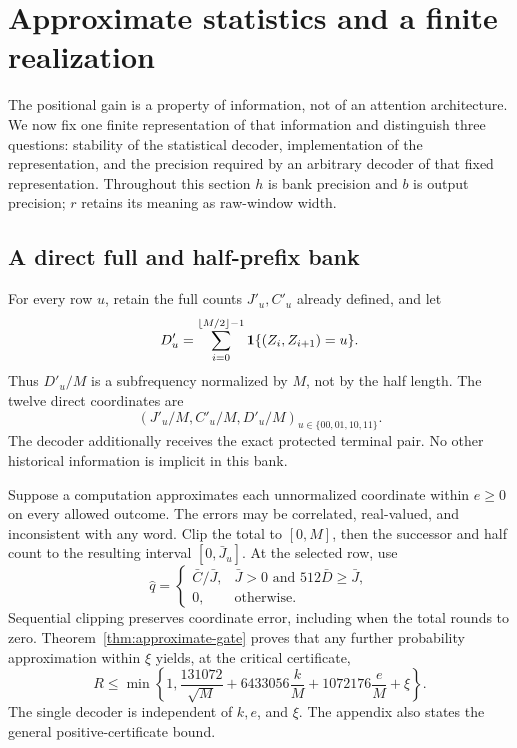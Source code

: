 \section{Approximate statistics and a finite realization}\label{sec:finite-implementation}
The positional gain is a property of information, not of an attention architecture. We now fix one finite representation of that information and distinguish three questions: stability of the statistical decoder, implementation of the representation, and the precision required by an arbitrary decoder of that fixed representation. Throughout this section $h$ is bank precision and $b$ is output precision; $r$ retains its meaning as raw-window width.

\subsection{A direct full and half-prefix bank}
For every row $u$, retain the full counts $J'_u,C'_u$ already defined, and let
\[
 D'_u=\sum_{i=0}^{\lfloor M/2\rfloor-1}
       \mathbf 1\{(Z_i,Z_{i+1})=u\}.
\]
Thus $D'_u/M$ is a subfrequency normalized by $M$, not by the half length. The twelve direct coordinates are
\begin{equation}\label{eq:direct-bank}
 (J'_u/M,C'_u/M,D'_u/M)_{u\in\{00,01,10,11\}}.
\end{equation}
The decoder additionally receives the exact protected terminal pair. No other historical information is implicit in this bank.

Suppose a computation approximates each unnormalized coordinate within $e\ge0$ on every allowed outcome. The errors may be correlated, real-valued, and inconsistent with any word. Clip the total to $[0,M]$, then the successor and half count to the resulting interval $[0,\bar J_u]$. At the selected row, use
\begin{equation}\label{eq:approx-gate-main}
 \widehat q=\begin{cases}
 \bar C/\bar J,&\bar J>0\text{ and }512\bar D\ge\bar J,\\
 0,&\text{otherwise}.
 \end{cases}
\end{equation}
Sequential clipping preserves coordinate error, including when the total rounds to zero. Theorem~\ref{thm:approximate-gate} proves that any further probability approximation within $\xi$ yields, at the critical certificate,
\begin{equation}\label{eq:approx-risk-main}
 R\le\min\left\{1,\frac{131072}{\sqrt M}
       +6433056\frac{k}{M}+1072176\frac eM+\xi\right\}.
\end{equation}
The single decoder is independent of $k,e$, and $\xi$. The appendix also states the general positive-certificate bound.

